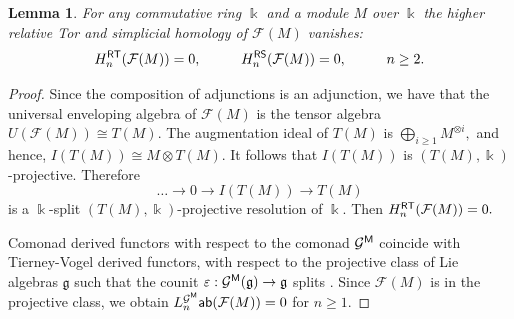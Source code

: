 \documentclass{amsart}
\numberwithin{equation}{section}
\newtheorem{lemma}[theorem]{Lemma}
\theoremstyle{definition}
\def\FF{\mathcal{F}}
\def\GG{\mathcal{G}}
\def\gg{\mathfrak{g}}
\def\kk{\Bbbk}
\begin{document}
\begin{lemma}\label{lemma_RT-hom_of_free_rel}
For any commutative ring $\kk$ and a module $M$ over $\kk$ the higher relative Tor and simplicial homology of $\FF(M)$ vanishes:
$$H^{\sf RT}_n(\FF(M))=0, \hspace{1cm} H^{\sf RS}_n(\FF(M))=0,  \hspace{1cm} n\geq 2.$$
\end{lemma}
\begin{proof}
Since the composition of adjunctions is an adjunction, we have that the universal enveloping algebra of $\FF(M)$ is the tensor algebra 
$U(\FF(M)) \cong  T(M).$ 
The augmentation ideal of $T(M)$ is $\bigoplus_{i\geq 1} M^{\otimes i},$ and hence, $I(T(M))\cong M\otimes T(M).$ It follows that $I(T(M))$ is $(T(M),\kk)$-projective. Therefore $$\dots \to 0\to I(T(M))\to T(M)$$ is a $\kk$-split $(T(M),\kk)$-projective resolution of $\kk.$ Then $H^{\sf RT}_n(\FF(M))=0.$

Comonad derived functors with respect to the comonad $\GG^{\sf M}$ coincide with Tierney-Vogel derived functors, with respect to the projective class of Lie algebras $\gg$ such that the counit $\varepsilon: \GG^{\sf M}(\gg)\to \gg$ splits \cite[Th. 3.1]{tierney1969simplicial}. Since $\FF(M)$ is in the projective class, we obtain
$L_n^{\GG^{\sf M}}{\sf ab}(\FF(M))=0$ for $n\geq 1.$  
\end{proof}
\end{document}
